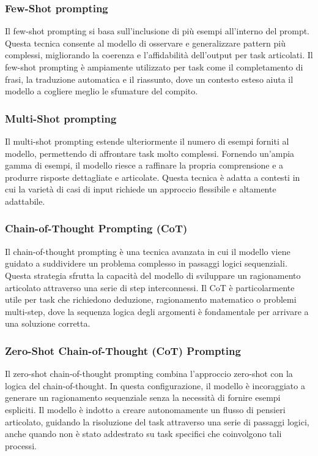\documentclass[target=mst,aauheader=,style=]{thud}
\begin{document}
\subsubsection{Few-Shot prompting}
Il few-shot prompting si basa sull’inclusione di più esempi all’interno del prompt. Questa tecnica consente al modello di osservare e generalizzare pattern più complessi, migliorando la coerenza e l’affidabilità dell’output per task articolati. Il few-shot prompting è ampiamente utilizzato per task come il completamento di frasi, la traduzione automatica e il riassunto, dove un contesto esteso aiuta il modello a cogliere meglio le sfumature del compito.

\subsubsection{Multi-Shot prompting}
Il multi-shot prompting estende ulteriormente il numero di esempi forniti al modello, permettendo di affrontare task molto complessi. Fornendo un’ampia gamma di esempi, il modello riesce a raffinare la propria comprensione e a produrre risposte dettagliate e articolate. Questa tecnica è adatta a contesti in cui la varietà di casi di input richiede un approccio flessibile e altamente adattabile.

\subsubsection{Chain-of-Thought Prompting (CoT)}
Il chain-of-thought prompting è una tecnica avanzata in cui il modello viene guidato a suddividere un problema complesso in passaggi logici sequenziali. Questa strategia sfrutta la capacità del modello di sviluppare un ragionamento articolato attraverso una serie di step interconnessi. Il CoT è particolarmente utile per task che richiedono deduzione, ragionamento matematico o problemi multi-step, dove la sequenza logica degli argomenti è fondamentale per arrivare a una soluzione corretta.

\subsubsection{Zero-Shot Chain-of-Thought (CoT) Prompting}
Il zero-shot chain-of-thought prompting combina l’approccio zero-shot con la logica del chain-of-thought. In questa configurazione, il modello è incoraggiato a generare un ragionamento sequenziale senza la necessità di fornire esempi espliciti. Il modello è indotto a creare autonomamente un flusso di pensieri articolato, guidando la risoluzione del task attraverso una serie di passaggi logici, anche quando non è stato addestrato su task specifici che coinvolgono tali processi.
\end{document}
